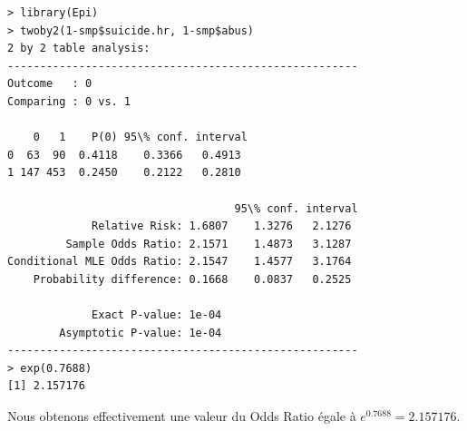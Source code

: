 \begin{lstlisting}[language=html]
> library(Epi)
> twoby2(1-smp$suicide.hr, 1-smp$abus)
2 by 2 table analysis: 
------------------------------------------------------ 
Outcome   : 0 
Comparing : 0 vs. 1 

    0   1    P(0) 95\% conf. interval
0  63  90  0.4118    0.3366   0.4913
1 147 453  0.2450    0.2122   0.2810

                                   95\% conf. interval
             Relative Risk: 1.6807    1.3276   2.1276
         Sample Odds Ratio: 2.1571    1.4873   3.1287
Conditional MLE Odds Ratio: 2.1547    1.4577   3.1764
    Probability difference: 0.1668    0.0837   0.2525

             Exact P-value: 1e-04 
        Asymptotic P-value: 1e-04 
------------------------------------------------------
> exp(0.7688)
[1] 2.157176
\end{lstlisting}
Nous obtenons effectivement une valeur du Odds Ratio égale à $e^{0.7688} = 2.157176$.

\newpage


